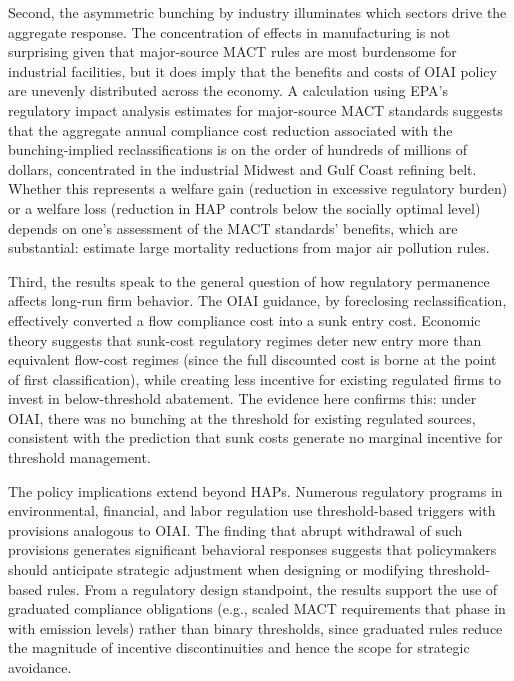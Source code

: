 \documentclass[12pt]{article}
\begin{document}
Second, the asymmetric bunching by industry illuminates which sectors drive the aggregate response. The concentration of effects in manufacturing is not surprising given that major-source MACT rules are most burdensome for industrial facilities, but it does imply that the benefits and costs of OIAI policy are unevenly distributed across the economy. A calculation using EPA's regulatory impact analysis estimates for major-source MACT standards suggests that the aggregate annual compliance cost reduction associated with the bunching-implied reclassifications is on the order of hundreds of millions of dollars, concentrated in the industrial Midwest and Gulf Coast refining belt. Whether this represents a welfare gain (reduction in excessive regulatory burden) or a welfare loss (reduction in HAP controls below the socially optimal level) depends on one's assessment of the MACT standards' benefits, which are substantial: \citet{KeiserShapiro2019} estimate large mortality reductions from major air pollution rules.

Third, the results speak to the general question of how regulatory permanence affects long-run firm behavior. The OIAI guidance, by foreclosing reclassification, effectively converted a flow compliance cost into a sunk entry cost. Economic theory suggests that sunk-cost regulatory regimes deter new entry more than equivalent flow-cost regimes (since the full discounted cost is borne at the point of first classification), while creating less incentive for existing regulated firms to invest in below-threshold abatement. The evidence here confirms this: under OIAI, there was no bunching at the threshold for existing regulated sources, consistent with the prediction that sunk costs generate no marginal incentive for threshold management.

The policy implications extend beyond HAPs. Numerous regulatory programs in environmental, financial, and labor regulation use threshold-based triggers with provisions analogous to OIAI. The finding that abrupt withdrawal of such provisions generates significant behavioral responses suggests that policymakers should anticipate strategic adjustment when designing or modifying threshold-based rules. From a regulatory design standpoint, the results support the use of graduated compliance obligations (e.g., scaled MACT requirements that phase in with emission levels) rather than binary thresholds, since graduated rules reduce the magnitude of incentive discontinuities and hence the scope for strategic avoidance.
\end{document}
